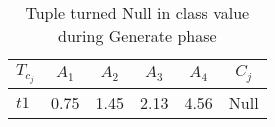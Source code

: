 \begin{table}[h]
\caption{Tuple turned Null in class value during Generate phase}
\label{table:table2_5}
\centering
\begin{tabular}{lccccc}
	\toprule
	\textbf{$\mathit{T_{c_j}}$} & \textbf{$\mathit{A_1}$} & \textbf{$\mathit{A_2}$} & \textbf{$\mathit{A_3}$} & \textbf{$\mathit{A_4}$} & \textbf{$\mathit{C_j}$} \\
	\midrule
	$\mathit{t1}$ & 0.75 & 1.45 & 2.13 & 4.56 & Null \\
	\bottomrule
\end{tabular} 
\end{table}
